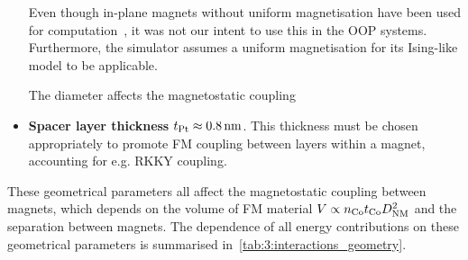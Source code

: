 \begin{itemize}
	Even though in-plane magnets without uniform magnetisation have been used for computation~\cite{gartside2022reconfigurable}, it was not our intent to use this in the OOP systems.
	Furthermore, the \hotspice simulator assumes a uniform magnetisation for its Ising-like model to be applicable. \par
	The diameter affects the magnetostatic coupling 
	\item \textbf{Spacer layer thickness} $t_{\ce{Pt}} \approx \SI{0.8}{\nano\metre}$.
	This thickness must be chosen appropriately to promote FM coupling between layers within a magnet, accounting for e.g. RKKY coupling.
\end{itemize}

These geometrical parameters all affect the magnetostatic coupling between magnets, which depends on the volume of FM material $V \propto n_{\ce{Co}} t_{\ce{Co}} D_\mathrm{NM}^2$ and the separation between magnets.
The dependence of all energy contributions on these geometrical parameters is summarised in~\cref{tab:3:interactions_geometry}.


